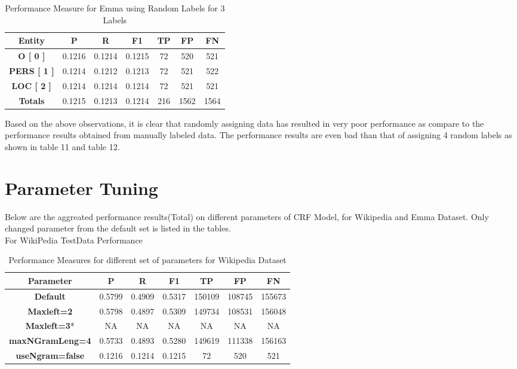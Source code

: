\documentclass[12pt]{article}
\begin{document}
\begin{enumerate}
\begin{enumerate}[label={\alph*.}]
\begin{enumerate}[label={\roman*.}]
\begin{table}[ht!]
\centering
\begin{tabular}{ |c|c|c|c|c|c|c|} 
\hline 
\textbf{Entity} & \textbf{P} & \textbf{R} & \textbf{F1} &\textbf{TP} &\textbf{FP} & \textbf{FN} \\ [2ex]
\hline 
\textbf{O [ 0 ]} & 0.1216 & 0.1214 & 0.1215 & 72 & 520 & 521\\ [1ex]
\hline 
\textbf{PERS [ 1 ]} & 0.1214 & 0.1212 & 0.1213 & 72 & 521 & 522\\ [1ex]
\hline
\textbf{LOC [ 2 ]} & 0.1214 & 0.1214 & 0.1214 & 72 & 521 & 521\\ [1ex]
\hline
\textbf{Totals} & 0.1215 & 0.1213 & 0.1214 & 216 & 1562 & 1564 \\  [1ex]

\hline
\end{tabular}
\caption{Performance Measure for Emma using Random Labels for 3 Labels}
\label{table:12}
\end{table}
Based on the above observations, it is clear that randomly assigning data has resulted in very poor performance as compare to the performance results obtained from manually labeled data. The performance results are even bad than that of assigning 4 random labels as shown in table 11 and table 12.\\
\end{enumerate}
\end{enumerate}
\end{enumerate}

\section{Parameter Tuning}
Below are the aggreated performance results(Total) on different parameters of CRF Model, for Wikipedia and Emma Dataset. Only changed parameter from the default set is listed in the tables. \\

For WikiPedia TestData Performance
\begin{table}[ht!]
\centering
\begin{tabular}{ |c|c|c|c|c|c|c|} 
\hline 
 \textbf{Parameter} & \textbf{P} & \textbf{R} & \textbf{F1} &\textbf{TP} &\textbf{FP} & \textbf{FN} \\ [2ex]
\hline 
\textbf{Default} &0.5799 &	0.4909 & 0.5317	& 150109 & 108745 &	155673\\ [1ex]
\hline 
\textbf{Maxleft=2} & 0.5798 & 0.4897 & 0.5309 & 149734 & 108531	& 156048\\ [1ex]
\hline 
\textbf{Maxleft=3}* & NA & NA & NA & NA & NA & NA\\ [1ex]
\hline 
\textbf{maxNGramLeng=4} & 0.5733 & 0.4893 &	0.5280 & 149619	& 111338 & 156163\\ [1ex]
\hline 
\textbf{useNgram=false} & 0.1216 & 0.1214 & 0.1215 & 72 & 520 & 521\\ [1ex]
\hline 
\end{tabular}
\caption{Performance Measures for different set of parameters for Wikipedia Dataset}
\label{table:13}
\end{table}
\end{document}
